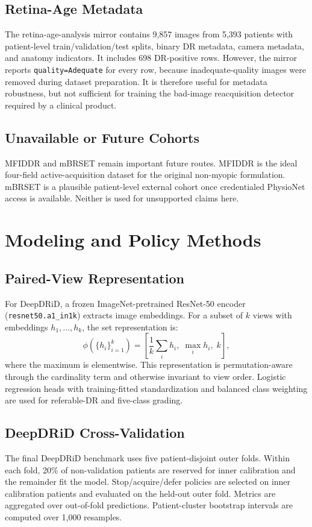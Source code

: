 \documentclass[journal]{IEEEtran}
\begin{document}
\subsection{Retina-Age Metadata}
The retina-age-analysis mirror contains 9,857 images from 5,393 patients with patient-level train/validation/test splits, binary DR metadata, camera metadata, and anatomy indicators. It includes 698 DR-positive rows. However, the mirror reports \texttt{quality=Adequate} for every row, because inadequate-quality images were removed during dataset preparation. It is therefore useful for metadata robustness, but not sufficient for training the bad-image reacquisition detector required by a clinical product.

\subsection{Unavailable or Future Cohorts}
MFIDDR and mBRSET remain important future routes. MFIDDR is the ideal four-field active-acquisition dataset for the original non-myopic formulation. mBRSET is a plausible patient-level external cohort once credentialed PhysioNet access is available. Neither is used for unsupported claims here.

\section{Modeling and Policy Methods}
\subsection{Paired-View Representation}
For DeepDRiD, a frozen ImageNet-pretrained ResNet-50 encoder (\texttt{resnet50.a1\_in1k}) extracts image embeddings. For a subset of $k$ views with embeddings $h_1,\ldots,h_k$, the set representation is:
\[
\phi(\{h_i\}_{i=1}^k)=
\left[
\frac{1}{k}\sum_i h_i,\;
\max_i h_i,\;
k
\right],
\]
where the maximum is elementwise. This representation is permutation-aware through the cardinality term and otherwise invariant to view order. Logistic regression heads with training-fitted standardization and balanced class weighting are used for referable-DR and five-class grading.

\subsection{DeepDRiD Cross-Validation}
The final DeepDRiD benchmark uses five patient-disjoint outer folds. Within each fold, 20\% of non-validation patients are reserved for inner calibration and the remainder fit the model. Stop/acquire/defer policies are selected on inner calibration patients and evaluated on the held-out outer fold. Metrics are aggregated over out-of-fold predictions. Patient-cluster bootstrap intervals are computed over 1,000 resamples.
\end{document}
